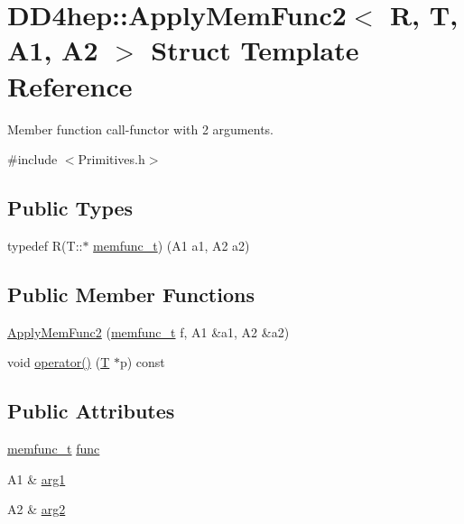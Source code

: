 \hypertarget{struct_d_d4hep_1_1_apply_mem_func2}{}\section{D\+D4hep\+:\+:Apply\+Mem\+Func2$<$ R, T, A1, A2 $>$ Struct Template Reference}
\label{struct_d_d4hep_1_1_apply_mem_func2}


Member function call-\/functor with 2 arguments.  




{\ttfamily \#include $<$Primitives.\+h$>$}

\subsection*{Public Types}
\begin{DoxyCompactItemize}
\item 
typedef R(T\+::$\ast$ \hyperlink{struct_d_d4hep_1_1_apply_mem_func2_a73ec255989fcf165046db1689d8c748a}{memfunc\+\_\+t}) (A1 a1, A2 a2)
\end{DoxyCompactItemize}
\subsection*{Public Member Functions}
\begin{DoxyCompactItemize}
\item 
\hyperlink{struct_d_d4hep_1_1_apply_mem_func2_a0ba82d9b15161c878526ffc012f449f6}{Apply\+Mem\+Func2} (\hyperlink{struct_d_d4hep_1_1_apply_mem_func2_a73ec255989fcf165046db1689d8c748a}{memfunc\+\_\+t} f, A1 \&a1, A2 \&a2)
\item 
void \hyperlink{struct_d_d4hep_1_1_apply_mem_func2_abe561ce984121449249cc7f371986686}{operator()} (\hyperlink{class_t}{T} $\ast$p) const
\end{DoxyCompactItemize}
\subsection*{Public Attributes}
\begin{DoxyCompactItemize}
\item 
\hyperlink{struct_d_d4hep_1_1_apply_mem_func2_a73ec255989fcf165046db1689d8c748a}{memfunc\+\_\+t} \hyperlink{struct_d_d4hep_1_1_apply_mem_func2_a7fc130521dd8099937693fdf25eaaaaf}{func}
\item 
A1 \& \hyperlink{struct_d_d4hep_1_1_apply_mem_func2_a07f0ada96e3eb80a5934f530c994b3c2}{arg1}
\item 
A2 \& \hyperlink{struct_d_d4hep_1_1_apply_mem_func2_a2c9f7dbd482c849c53ee6f499d6a0713}{arg2}
\end{DoxyCompactItemize}


